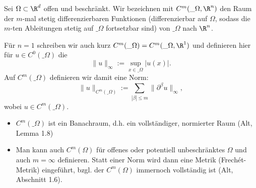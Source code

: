 \begin{df} \label{1.3}
	Sei $\Omega \subset \R^d$ offen und beschränkt.
	Wir bezeichnen mit $C^m(\_\Omega, \R^n)$ den Raum der $m$-mal stetig differenzierbaren Funktionen (differenzierbar auf $\Omega$, sodass die $m$-ten Ableitungen stetig auf $\_\Omega$ fortsetzbar sind) von $\_\Omega$ nach $\R^n$.

	Für $n = 1$ schreiben wir auch kurz $C^m(\_\Omega) = C^m(\_\Omega, \R^1)$ und definieren hier für $u \in C^0(\_\Omega)$ die 
	\[
		\|u\|_\infty := \sup_{x\in \_\Omega} |u(x)|.
	\]
	Auf $C^m(\_\Omega)$ definieren wir damit eine Norm:
	\[
		\|u\|_{C^m(\_\Omega)} := \sum_{|\beta| \le m} \|\partial^\beta u\|_\infty,
	\]
	wobei $u \in C^m(\_\Omega)$.
	\begin{note}
		\begin{itemize}
			\item
				$C^m(\_\Omega)$ ist ein Banachraum, d.h. ein vollständiger, normierter Raum (Alt, Lemma 1.8)
			\item
				Man kann auch $C^m(\Omega)$ für offenes oder potentiell unbeschränktes $\Omega$ und auch $m = \infty$ definieren.
				Statt einer Norm wird dann eine Metrik (Frechét-Metrik) eingeführt, bzgl. der $C^m(\Omega)$ immernoch vollständig ist (Alt, Abschnitt 1.6).
		\end{itemize}
	\end{note}
\end{df}

